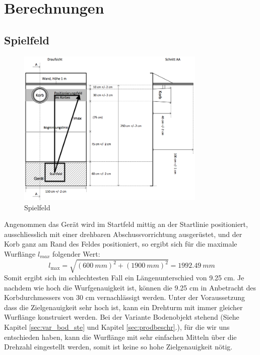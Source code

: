 \section{Berechnungen}
\label{sec:calc}

\subsection{Spielfeld}
\begin{figure}[h!]          
    \centering             
    \includegraphics[width=0.8\textwidth]{fig/Bild_Spielfeld.png}    
    \caption{Spielfeld}
    \label{fig:spielfeld}        
\end{figure}
\noindent
Angenommen das Gerät wird im Startfeld mittig an der Startlinie positioniert, 
ausschliesslich mit einer drehbaren Abschussvorrichtung ausgerüstet, und der 
Korb ganz am Rand des Feldes positioniert, so ergibt sich für die maximale 
Wurflänge $l_{max}$ folgender Wert: 
\[\ l_\text{max} = \sqrt{(600~mm)^2 + (1900~mm)^2} = 1992.49~mm \]
Somit ergibt sich im schlechtesten Fall ein Längenunterschied von  9.25 cm. 
Je nachdem wie hoch die Wurfgenauigkeit ist, können die 9.25 cm in 
Anbetracht des Korbdurchmessers von 30 cm vernachlässigt werden. Unter der Voraussetzung 
dass die Zielgenauigkeit sehr hoch ist, kann ein Drehturm mit immer gleicher Wurflänge 
konstruiert werden. Bei der Variante Bodenobjekt stehend (Siehe Kapitel 
\ref{sec:var_bod_ste} und Kapitel \ref{sec:prodbeschr}.), für die wir 
uns entschieden haben, kann die Wurflänge mit sehr einfachen Mitteln über die Drehzahl
eingestellt werden, somit ist keine so hohe Zielgenauigkeit nötig.

